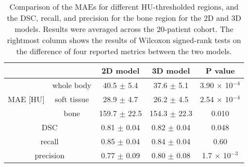 \begin{table}[ht]
\begin{center}
\begin{tabular}{|c|c|c|c|c|}
\hline
\multicolumn{2}{|c|}{} & 2D model & 3D model & P value\\
\hline
\multirow{3}{*}{MAE [HU]} & whole body & 40.5 $\pm$ 5.4 & 37.6 $\pm$ 5.1 & 3.90 $\times$ 10$^{-4}$\\
& soft tissue & 28.9 $\pm$ 4.7 & 26.2 $\pm$ 4.5 & 2.54 $\times$ 10$^{-4}$\\
& bone & 159.7 $\pm$ 22.5 & 154.3 $\pm$ 22.3 & 0.010\\ \hline
\multicolumn{2}{|c|}{DSC} & 0.81 $\pm$ 0.04 & 0.82 $\pm$ 0.04 & 0.048\\
\hline
\multicolumn{2}{|c|}{recall} & 0.85 $\pm$ 0.04 & 0.84 $\pm$ 0.04 & 0.60\\
\hline
\multicolumn{2}{|c|}{precision}  & 0.77 $\pm$ 0.09 & 0.80 $\pm$ 0.08 & 1.7 $\times$ 10$^{-3}$\\
\hline
\end{tabular}
\caption{\label{tab1} Comparison of the MAEs for different HU-thresholded regions, and the DSC, recall, and precision for the bone region for the 2D and 3D models. Results were averaged across the 20-patient cohort. The rightmost column shows the results of Wilcoxon signed-rank tests on the difference of four reported metrics between the two models.} 
\end{center}
\end{table} 
